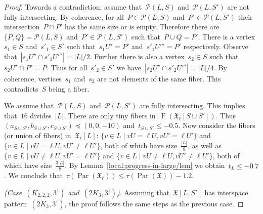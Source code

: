 \documentclass[english,a4paper]{article}
\theoremstyle{plain}
\theoremstyle{definition}
\newcommand{\abs}[1]{| #1 |}
\DeclareMathOperator{\Fibers}{F}
\newcommand{\coherentConfig}{\ensuremath{\mathfrak{X}}}
\newcommand{\fibers}[1]{\ensuremath{\Fibers \left( #1 \right)}}
\newcommand{\interspace}[2]{\ensuremath{\coherentConfig[#1,#2]}}
\newcommand{\equivalenceClasses}[1]{\ensuremath{\mathcal{P}(#1)}}
\DeclareMathOperator{\parameters}{Par}
\newcommand{\ipsixTriangle}               {\ensuremath{(\disjointCliques{2}{3},3^\dag)}}
\newcommand{\ipsixMatchingComplementD}{\ensuremath{(\clique{2,2,2},3^\ddag)}}
\newcommand{\clique}[1]{\ensuremath{K_{#1}}}
\newcommand{\disjointCliques}[2]{\ensuremath{#1 \clique{#2}}}
\begin{document}
\begin{proof}
    Towards a contradiction, assume that~$\equivalenceClasses{L,S}$ and~$\equivalenceClasses{L, S'}$ are not fully intersecting.
    By coherence, for all~$P \in \equivalenceClasses{L,S}$ and~$P' \in \equivalenceClasses{L,S'}$ their intersection~$P \cap P'$ has the same size or is empty.
    Therefore there are~$\{P, Q\} = \equivalenceClasses{L,S}$ and~$P' \in \equivalenceClasses{L,S'}$ such that~$P \cup Q = P'$.
    There is a vertex~$s_1 \in S$ and~$s'_1 \in S'$ such that~$s_1 U^\star = P'$ and~$s'_1 U'^\star = P'$ respectively.
    Observe that~$|s_1 U^\star \cap s'_1 U'^\star| = |L|/2$.
    Further there is also a vertex~$s_2 \in S$ such that~$s_2 U^\star \cap P' = P$.
    Thus for all~$s'_2 \in S'$ we have~$|s_2 U^\star \cap s'_2 U'^\star| = |L|/4$.
    By coherence, vertices~$s_1$ and~$s_2$ are not elements of the same fiber.
    This contradicts~$S$ being a fiber.

    We assume that~$\equivalenceClasses{L,S}$ and~$\equivalenceClasses{L, S'}$ are fully intersecting.
    This implies that~$16$ divides~$|L|$.
    There are only tiny fibers in~$\fibers{\coherentConfig_\ell[S \cup S']}$.
    Thus~$(a_{S \cup S'},b_{S \cup S'}, c_{S \cup S'}) \preceq (0,0,-10)$ and~$t_{S \cup S'} \leq - 0.5$.
    Now consider the fibers (or union of fibers) in~$\coherentConfig_\ell[L]$:
    $\{ v\in L \mid v U =    \ell U, vU' =    \ell U'\}$ and
    $\{ v\in L \mid v U =    \ell U, vU' \neq \ell U'\}$, both of which have size~$\frac{\abs{L}}{8}$, as well as
    $\{ v\in L \mid v U \neq \ell U, vU' =    \ell U'\}$ and
    $\{ v\in L \mid v U \neq \ell U, vU' \neq \ell U'\}$, both of which have size~$\frac{3\abs{L}}{8}$.
    By Lemma~\ref{local:progress-in-large/lem} we obtain~$t_L \leq -0.7$.
    We conclude that~$\tau(\parameters(\coherentConfig_\ell)) \leq \tau(\parameters(\coherentConfig))- 1.2$.




    \textit{(Case~$\ipsixMatchingComplementD$ and~$\ipsixTriangle$)}.
    Assuming that~$\interspace{L}{S'}$ has interspace pattern~$\ipsixTriangle$, the proof follows the same steps as the previous case.
\end{proof}
\end{document}
